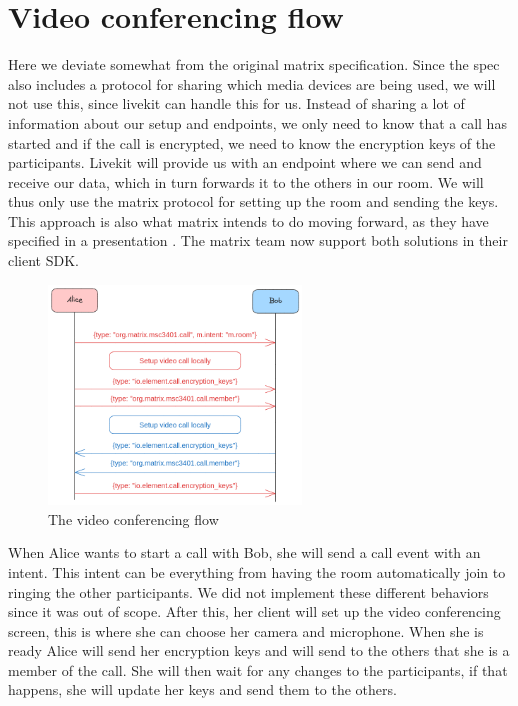 \documentclass{report}
\begin{document}
    \section{Video conferencing flow}
    Here we deviate somewhat from the original matrix specification. Since the spec also includes a protocol for
    sharing which media devices are being used, we will not use this, since livekit can handle this for us. Instead
    of sharing a lot of information about our setup and endpoints, we only need to know that a call has started and
    if the call is encrypted, we need to know the encryption keys of the participants. Livekit will provide us with
    an endpoint where we can send and receive our data, which in turn forwards it to the others in our room. We
    will thus only use the matrix protocol for setting up the room and sending the keys. This approach is also what
    matrix intends to do moving forward, as they have specified in a presentation . The
    matrix team now support both solutions in their client SDK.

    \begin{figure}
        \centering
        \includegraphics[width=0.6\textwidth]{img/Callflow.excalidraw.png}
        \caption{The video conferencing flow}
        \label{fig:video-conference-flow}
    \end{figure}

    When Alice wants to start a call with Bob, she will send a call event with an intent. This intent can be
    everything from having the room automatically join to ringing the other participants. We did not implement
    these different behaviors since it was out of scope. After this, her client will set up the video conferencing
    screen, this is where she can choose her camera and microphone. When she is ready Alice will send her encryption
    keys and will send to the others that she is a member of the call. She will then wait for any changes to the participants,
    if that happens, she will update her keys and send them to the others.
\end{document}
